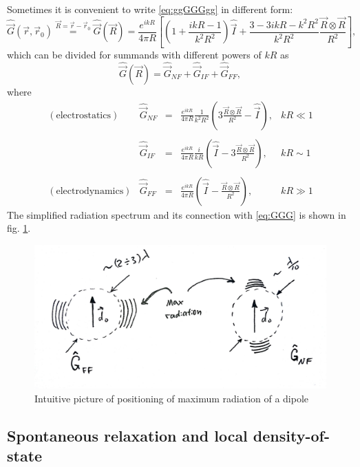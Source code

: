 Sometimes it is convenient to write  \eqref{eq:ggGGGgg} in different form:
\begin{equation}
	\hat{\vec{G}} (\vec{r}, \vec{r}_0) \overset{\vec{R} = \vec{r} - \vec{r}_0}{=} \hat{\vec{G}}(\vec{R}) = \frac{e^{ikR}}{4\pi R} \left[  \left( 1 + \frac{ikR - 1}{k^2R^2} \right) \hat{\vec{I}} + \frac{3 - 3ikR - k^2R^2}{k^2R^2} \frac{\vec{R}\otimes\vec{R}}{R^2} \right],
\end{equation}
which can be divided for summands with different powers of $kR$ as
\begin{equation}
	\hat{\vec{G}}(\vec{R}) = \hat{\vec{G}}_{NF} + \hat{\vec{G}}_{IF} + \hat{\vec{G}}_{FF},
	\label{eq:GGG}
\end{equation}
where
\begin{equation*}
	\begin{matrix}
		(\text{electrostatics}) & \hat{\vec{G}}_{NF} &=& \frac{e^{ikR}}{4\pi R} \frac{1}{k^2R^2} \left( 3 \frac{\vec{R}\otimes\vec{R}}{R^2} - \hat{\vec{I}} \right), & kR \ll 1 \\ \\
		& \hat{\vec{G}}_{IF} &=& \frac{e^{ikR}}{4\pi R} \frac{i}{kR}  \left( \hat{\vec{I}} - 3\frac{\vec{R}\otimes\vec{R}}{R^2} \right), & kR \sim 1 \\ \\
		(\text{electrodynamics})& \hat{\vec{G}}_{FF} &=& \frac{e^{ikR}}{4\pi R}  \left( \hat{\vec{I}} - \frac{\vec{R}\otimes\vec{R}}{R^2} \right), & kR \gg 1
	\end{matrix}
\end{equation*}
The simplified radiation spectrum and its connection with \eqref{eq:GGG} is shown in fig. \ref{fig:radiation1}.

\begin{figure}
	\centering
	\includegraphics[width=0.6\linewidth]{fig/L8/radiation_1}
	\caption{Intuitive picture of positioning of maximum radiation of a dipole}
	\label{fig:radiation1}
\end{figure}


\subsection{Spontaneous relaxation and local density-of-state}

